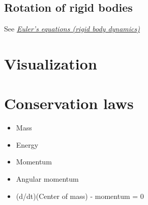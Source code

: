 \section{Rotation of rigid bodies}

See \textit{\href{http://en.wikipedia.org/wiki/Euler\%27s_equations_\%28rigid_body_dynamics\%29}{Euler's equations (rigid body dynamics)}}

\chapter{Visualization}

\chapter{Conservation laws}

\begin{itemize}
    \item Mass
    \item Energy
    \item Momentum
    \item Angular momentum
    \item (d/dt)(Center of mass) - momentum = 0
\end{itemize}